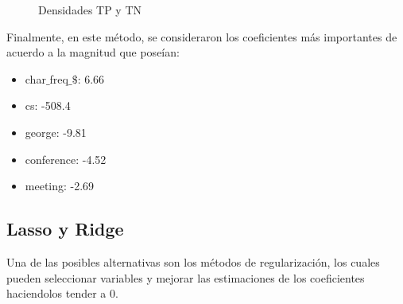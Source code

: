 \documentclass[12pt, letterpaper]{article}
\begin{document}
\begin{figure}[h]
 \centering
 \caption{Densidades TP y TN}
 \label{log7}
\end{figure}

Finalmente, en este método, se consideraron los coeficientes más importantes de acuerdo a la magnitud que poseían:

\begin{itemize}
\item char$\_$freq$\_\$$: 6.66
\item cs: -508.4
\item george: -9.81
\item conference: -4.52
\item meeting: -2.69
\end{itemize} 

\subsection{Lasso y Ridge}

Una de las posibles alternativas son los métodos de regularización, los cuales pueden seleccionar variables y mejorar las estimaciones de los coeficientes haciendolos tender a 0.\\
\end{document}
